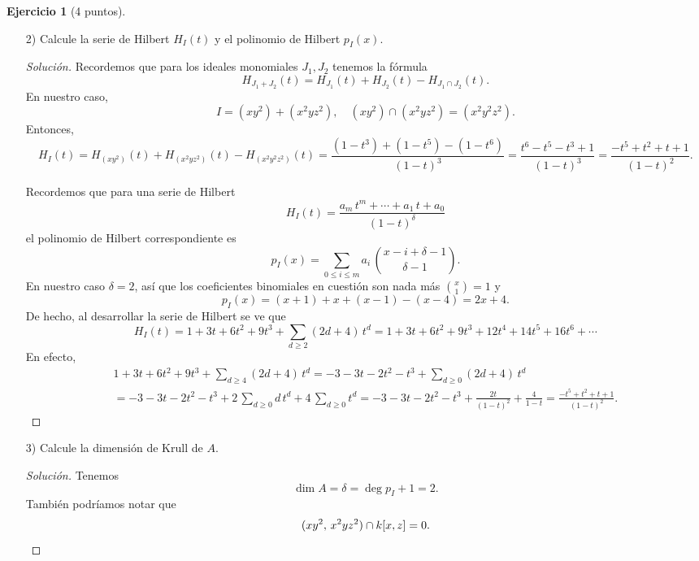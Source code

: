 \documentclass{article}
\theoremstyle{definition}
\newtheorem{ejerc}{Ejercicio}
\newenvironment{solucion}{\begin{proof}[Solución]}{\end{proof}}
\begin{document}
\begin{ejerc}[4 puntos]
\begin{enumerate}
\begin{solucion}
Los primos $\mathfrak{p}_1$ y $\mathfrak{p}_2$ son minimales, mientras que
$\mathfrak{p}_2 \supset \mathfrak{p}_1$ y
$\mathfrak{p}_3 \supset \mathfrak{p}_2$ son encajados.
\end{solucion}\fi

\item[2)] Calcule la serie de Hilbert $H_I (t)$ y el polinomio de Hilbert
  $p_I (x)$.

  \ifdefined\solutions\begin{solucion}
    Recordemos que para los ideales monomiales $J_1, J_2$ tenemos la fórmula
    $$H_{J_1 + J_2} (t) = H_{J_1} (t) + H_{J_2} (t) - H_{J_1\cap J_2} (t).$$
    En nuestro caso,
    $$I = (xy^2) + (x^2yz^2), \quad (xy^2) \cap (x^2yz^2) = (x^2y^2z^2).$$
    Entonces,
    \[ H_I (t) =
       H_{(xy^2)} (t) + H_{(x^2yz^2)} (t) - H_{(x^2y^2z^2)} (t) =
       \frac{(1-t^3) + (1-t^5) - (1-t^6)}{(1-t)^3} =
       \frac{t^6 - t^5 - t^3 + 1}{(1-t)^3} =
       \frac{-t^5 + t^2 + t + 1}{(1-t)^2}. \]

    Recordemos que para una serie de Hilbert
    $$H_I (t) = \frac{a_m\,t^m + \cdots + a_1\,t + a_0}{(1-t)^\delta}$$
    el polinomio de Hilbert correspondiente es
    $$p_I (x) = \sum_{0 \le i \le m} a_i\,{x-i+\delta-1 \choose \delta-1}.$$
    En nuestro caso $\delta = 2$, así que los coeficientes binomiales en cuestión son nada más ${x \choose 1} = 1$ y
    $$p_I (x) = (x+1) + x + (x-1) - (x-4) = 2x + 4.$$
    De hecho, al desarrollar la serie de Hilbert se ve que
    \[ H_I (t) =
       1 + 3t + 6t^2 + 9t^3 + \sum_{d\ge 2} (2d + 4)\,t^d =
       1 + 3t + 6t^2 + 9t^3 + 12t^4 + 14t^5 + 16t^6 + \cdots \]
    En efecto,
    \begin{multline*}
      1 + 3t + 6t^2 + 9t^3 + \sum_{d\ge 4} (2d + 4)\,t^d =
      -3 - 3t - 2t^2 - t^3 + \sum_{d\ge 0} (2d + 4)\,t^d \\
    = -3 - 3t - 2t^2 - t^3 + 2\,\sum_{d\ge 0} d\,t^d + 4\,\sum_{d\ge 0} t^d =
      -3 - 3t - 2t^2 - t^3 + \frac{2t}{(1-t)^2} + \frac{4}{1-t} =
      \frac{-t^5 + t^2 + t + 1}{(1-t)^2}.
    \end{multline*}
  \end{solucion}\fi

\item[3)] Calcule la dimensión de Krull de $A$.

  \ifdefined\solutions\begin{solucion}
    Tenemos
    $$\dim A = \delta = \deg p_I + 1 = 2.$$
    También podríamos notar que
    \[ (xy^2, \, x^2 y z^2) \cap k [x,z] = 0. \qedhere \]
  \end{solucion}\fi


\end{enumerate}
\end{ejerc}
\end{document}
